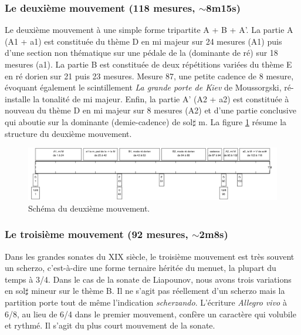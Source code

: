\subsubsection*{Le deuxième mouvement (118 mesures, $\sim$8m15s)}

Le deuxième mouvement à une simple forme tripartite A + B + A'. La partie A (A1 + a1) est constituée du thème D en mi majeur sur 24 mesures (A1) puis d'une section non thématique sur une pédale de la (dominante de ré) sur 18 mesures (a1). La partie B est constituée de deux répétitions variées du thème E en ré dorien sur 21 puis 23 mesures. Mesure 87, une petite cadence de 8 mesure, évoquant également le scintillement \emph{La grande porte de Kiev} de Moussorgski, ré-installe la tonalité de mi majeur. Enfin, la partie A' (A2 + a2) est constituée à nouveau du thème D en mi majeur sur 8 mesures (A2) et d'une partie conclusive qui aboutie sur la dominante (demie-cadence) de sol$\sharp$ m. La figure \ref{schema-2} résume la structure du deuxième mouvement.

\begin{figure}[!ht]
  \begin{bigcenter}
    \includegraphics[width=16cm, keepaspectratio]{frise-mvt2.png}
  \end{bigcenter}
  \caption{\label{schema-2}Schéma du deuxième mouvement.}
\end{figure}

\subsubsection*{Le troisième mouvement (92 mesures, $\sim$2m8s)}

Dans les grandes sonates du XIX\ieme{} siècle, le troisième mouvement est très souvent un scherzo, c'est-à-dire une forme ternaire héritée du menuet, la plupart du temps à 3/4. Dans le cas de la sonate de Liapounov, nous avons trois variations en sol$\sharp$ mineur sur le thème B. Il ne s'agit pas réellement d'un scherzo mais la partition porte tout de même l'indication \emph{scherzando}. L'écriture \emph{Allegro vivo} à 6/8, au lieu de 6/4 dans le premier mouvement, confère un caractère qui volubile et rythmé. Il s'agit du plus court mouvement de la sonate.

